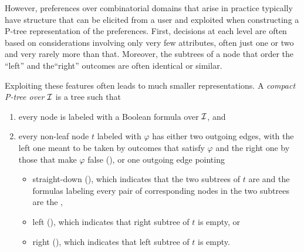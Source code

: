 However, preferences over combinatorial domains that arise in practice
typically have structure that can be elicited from a user and exploited
when constructing a P-tree representation of the preferences. First,
decisions at each level are often based on considerations involving
only very few attributes, often just one or two and very rarely more than that.
Moreover, the subtrees of a node that order the ``left'' and the``right''
outcomes are often identical or similar. 

Exploiting these features often leads to much smaller representations.  
A \emph{compact P-tree over} $\mathcal{I}$ is a tree such that
\begin{enumerate}[itemsep=0pt]
	\item every node is labeled with a Boolean formula over $\mathcal{I}$, and
  \item every non-leaf node $t$ labeled with $\varphi$ has either
        two outgoing edges, with the left one meant to be taken by 
        outcomes that satisfy $\varphi$ and the right one by those that
        make $\varphi$ false (), or one 
    outgoing edge pointing
    \begin{itemize}[itemsep=0pt]
      \item straight-down (), which indicates that the two subtrees of $t$ 
            are  and the formulas
            labeling every pair of corresponding nodes in the two subtrees are the ,
      \item left (), which indicates that right subtree 
      of $t$ is empty, or
      \item right (), which indicates that left subtree 
      of $t$ is empty.
    \end{itemize}
\end{enumerate}

